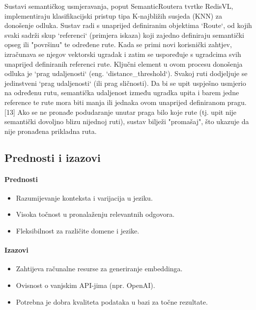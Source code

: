 Sustavi semantičkog usmjeravanja, poput SemanticRoutera tvrtke RedisVL, implementiraju klasifikacijski pristup tipa K-najbližih susjeda (KNN) za donošenje odluka. Sustav radi s unaprijed definiranim objektima `Route`, od kojih svaki sadrži skup `referenci` (primjera iskaza) koji zajedno definiraju semantički opseg ili "površinu" te određene rute. Kada se primi novi korisnički zahtjev, izračunava se njegov vektorski ugradak i zatim se uspoređuje s ugradcima svih unaprijed definiranih referenci rute. Ključni element u ovom procesu donošenja odluka je `prag udaljenosti` (eng. `distance\_threshold`). Svakoj ruti dodjeljuje se jedinstveni `prag udaljenosti` (ili prag sličnosti). Da bi se upit uspješno usmjerio na određenu rutu, semantička udaljenost između ugradka upita i barem jedne reference te rute mora biti manja ili jednaka ovom unaprijed definiranom pragu.[13] Ako se ne pronađe podudaranje unutar praga bilo koje rute (tj. upit nije semantički dovoljno blizu nijednoj ruti), sustav bilježi "promašaj", što ukazuje da nije pronađena prikladna ruta.

\subsection{Prednosti i izazovi}
\paragraph{Prednosti}
\begin{itemize}
    \item Razumijevanje konteksta i varijacija u jeziku.
    \item Visoka točnost u pronalaženju relevantnih odgovora.
    \item Fleksibilnost za različite domene i jezike.
\end{itemize}

\paragraph{Izazovi}
\begin{itemize}
    \item Zahtijeva računalne resurse za generiranje embeddinga.
    \item Ovisnost o vanjskim API-jima (npr. OpenAI).
    \item Potrebna je dobra kvaliteta podataka u bazi za točne rezultate.
\end{itemize}

